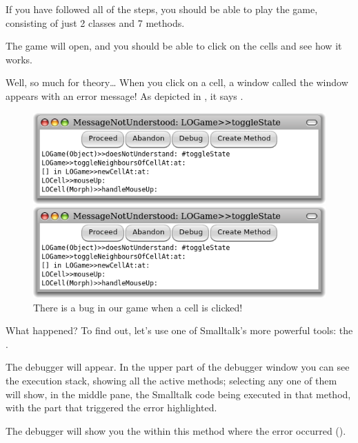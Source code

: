 \documentclass[a4paper,10pt,twoside]{book}
\begin{document}
If you have followed all of the steps, you should be able to play the game, consisting of just 2 classes and 7 methods.


The game will open, and you should be able to click on the cells and see how it works.

Well, so much for theory\ldots{}
When you click on a cell, a  window called the window appears with an error message!
As depicted in , it says .

\begin{figure}[ht]
\ifluluelse
	{\centerline{\includegraphics[width=\textwidth]{Error}}}
	{\centerline{\includegraphics[scale=0.7]{Error}}}
\caption{There is a bug in our game when a cell is clicked!
\label{fig:lightsOutError}}
\end{figure}

\noindent
What happened? To find out, let's use one of Smalltalk's more powerful tools: the .

The debugger will appear.
In the upper part of the debugger window you can see the execution stack, showing all the active methods; selecting any one of them will show, in the middle pane, the Smalltalk code being executed in that method, with the part that triggered the error highlighted.

The debugger will show you the  within this method where the error occurred ().
\end{document}
